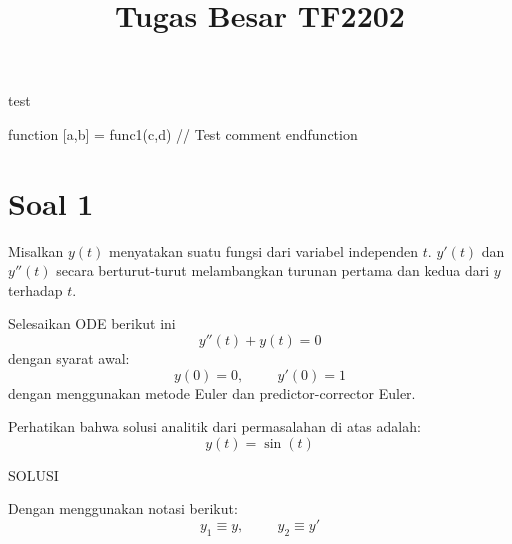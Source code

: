 \documentclass[11pt]{article}
\begin{document}
\title{Tugas Besar TF2202}
\date{}
\maketitle

test

\begin{scilabcode}
function [a,b] = func1(c,d)
  // Test comment
endfunction
\end{scilabcode}

\section{Soal 1}

Misalkan $y(t)$ menyatakan suatu fungsi dari variabel independen $t$.
$y'(t)$ dan $y''(t)$ secara berturut-turut melambangkan turunan pertama dan
kedua dari $y$ terhadap $t$.

Selesaikan ODE berikut ini
\begin{equation}
y''(t) + y(t) = 0
\end{equation}
dengan syarat awal:
\begin{equation}
y(0) = 0, \hspace{1cm} y'(0) = 1
\end{equation}
dengan menggunakan metode Euler dan predictor-corrector Euler.

Perhatikan bahwa solusi analitik dari permasalahan di atas adalah:
\begin{equation}
y(t) = \sin(t)
\end{equation}

SOLUSI

Dengan menggunakan notasi berikut:
\begin{equation}
y_1 \equiv y, \hspace{1cm} y_2 \equiv y'
\end{equation}
\end{document}
